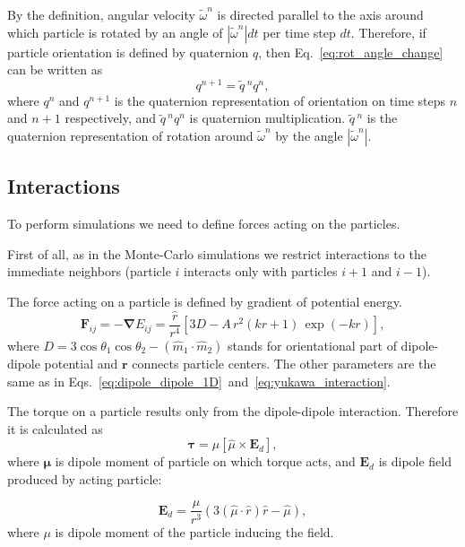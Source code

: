 By the definition, angular velocity $\tilde{\omega}^n$ is directed parallel to the axis around which particle is rotated by an angle of $|\tilde{\omega}^n|dt$ per time step $dt$. Therefore, if particle orientation is defined by quaternion $q$, then Eq.~\eqref{eq:rot_angle_change} can be written as
\begin{equation}
q^{n+1} = \tilde{q}\,^n q^{n} ,
\end{equation}
where $q^n$ and $q^{n+1}$ is the quaternion representation of orientation on time steps $n$ and $n+1$ respectively, and $\tilde{q}\,^n q^{n}$ is quaternion multiplication. $\tilde{q}\,^n$ is the quaternion representation of rotation around $\tilde{\omega}^n$ by the angle $|\tilde{\omega}^n|$.

\subsection{Interactions}

To perform simulations we need to define forces acting on the particles.

First of all, as in the Monte-Carlo simulations we restrict interactions to the immediate neighbors (particle $i$ interacts only with particles $i+1$ and $i-1$).

The force acting on a particle is defined by gradient of potential energy.
\begin{equation}
\label{eq:full_force}
	\boldsymbol{F}_{ij}
		= -\boldsymbol{\nabla} E_{ij}
		=  \frac{\hat{r}}{r^4} \left[3 D - A\, r^2 (k r +1) \, \exp(-k r) \right],
\end{equation}
where $D = 3 \cos \theta_1 \cos \theta_2 - (\hat{m}_1 \cdot \hat{m}_2)$ stands for orientational part of dipole-dipole potential and $\boldsymbol{r}$ connects particle centers. The other parameters are the same as in Eqs.~\eqref{eq:dipole_dipole_1D}~and~\eqref{eq:yukawa_interaction}.

The torque on a particle results only from the dipole-dipole interaction. Therefore it is calculated as
\begin{equation}
\label{eq:dipole_torque}
	\boldsymbol{\tau}  = \mu[\hat{\mu} \times \boldsymbol{E}_d ],
\end{equation}
where $\boldsymbol{\mu}$ is dipole moment of particle on which torque acts, and $\boldsymbol{E}_d$ is dipole field produced by acting particle:

\begin{equation}
\label{eq:dipole_field}
	\boldsymbol{E}_d = \frac{\mu}{r^3}
		\left(3 (\hat{\mu} \cdot \hat{r}) \hat{r} - \hat{\mu} \right),
\end{equation}
where $\mu$ is dipole moment of the particle inducing the field.

